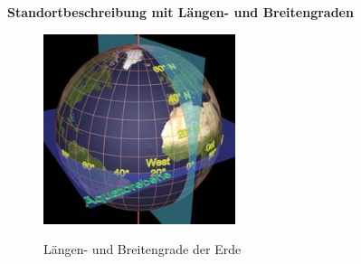 \textbf{Standortbeschreibung mit Längen- und Breitengraden}


\begin{figure}
  \centering
    \includegraphics[width=0.50\textwidth]{ref/images/grade.jpg}
   \caption{Längen- und Breitengrade der Erde}
  \label{fig:Grade der Erde}
   \cite{Grade}
\end{figure}



